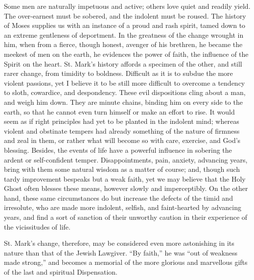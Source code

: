 Some men are naturally impetuous and active; others love quiet and
readily yield. The over-earnest must be sobered, and the indolent must
be roused. The history of Moses supplies us with an instance of a proud
and rash spirit, tamed down to an extreme gentleness of deportment. In
the greatness of the change wrought in him, when from a fierce, though
honest, avenger of his brethren, he became the meekest of men on the
earth, he evidences the power of faith, the influence of the Spirit on
the heart. St. Mark's history affords a specimen of the other, and still
rarer change, from timidity to boldness. Difficult as it is to subdue
the more violent passions, yet I believe it to be still more difficult
to overcome a tendency to sloth, cowardice, and despondency. These evil
dispositions cling about a man, and weigh him down. They are minute
chains, binding him on every side to the earth, so that he cannot even
turn himself or make an effort to rise. It would seem as if right
principles had yet to be planted in the indolent mind; whereas violent
and obstinate tempers had already something of the nature of firmness
and zeal in them, or rather what will become so with care, exercise, and
God's blessing. Besides, the events of life have a powerful influence in
sobering the ardent or self-confident temper. Disappointments, pain,
anxiety, advancing years, bring with them some natural wisdom as a
matter of course; and, though such tardy improvement bespeaks but a weak
faith, yet we may believe that the Holy Ghost often blesses these means,
however slowly and imperceptibly. On the other hand, these same
circumstances do but increase the defects of the timid and irresolute,
who are made more indolent, selfish, and faint-hearted by advancing
years, and find a sort of sanction of their unworthy caution in their
experience of the vicissitudes of life.

St. Mark's change, therefore, may be considered even more astonishing
in its nature than that of the Jewish Lawgiver. ``By faith,'' he
was ``out of weakness made strong,'' and becomes a memorial of
the more glorious and marvellous gifts of the last and spiritual
Dispensation.

